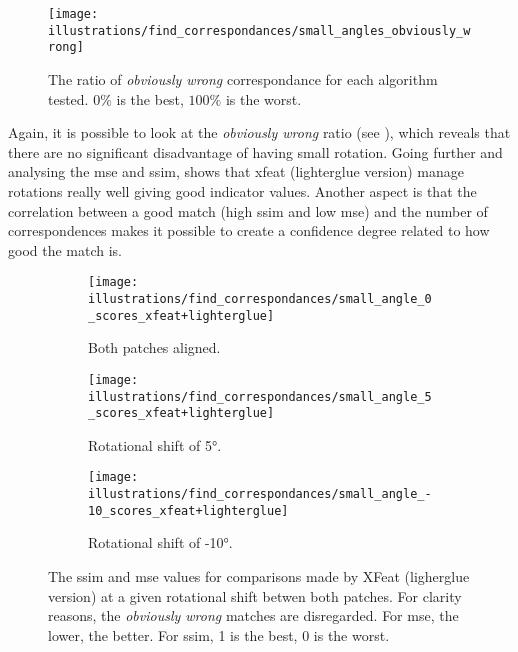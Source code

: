 \begin{figure}[ht!]
    \centering
    \texttt{[image: illustrations/find\_correspondances/small\_angles\_obviously\_wrong]}
    \caption{The ratio of \textit{obviously wrong} correspondance for each algorithm tested.
        $0\%$ is the best, $100\%$ is the worst.}
    \label{fig:find_corr:small_angles:obviously_wrong}
\end{figure}

Again, it is possible to look at the \textit{obviously wrong} ratio (see ),
which reveals that there are no significant disadvantage of having small rotation.
Going further and analysing the \gls{mse} and \gls{ssim},  shows that xfeat (lighterglue version)
manage rotations really well giving good indicator values.
Another aspect is that the correlation between a good match (high \gls{ssim} and low \gls{mse}) and the number of correspondences
makes it possible to create a confidence degree related to how good the match is.

\begin{figure}[ht!]
    \centering
    \begin{subfigure}[t]{0.32\textwidth}
        \texttt{[image: illustrations/find\_correspondances/small\_angle\_0\_scores\_xfeat+lighterglue]}
        \caption{Both patches aligned.}
        \label{fig:find_corr:small_angles:mse_ssim_xfeat+lg_0}
    \end{subfigure}
    \hfill
    \begin{subfigure}[t]{0.32\textwidth}
        \texttt{[image: illustrations/find\_correspondances/small\_angle\_5\_scores\_xfeat+lighterglue]}
        \caption{Rotational shift of 5°.}
        \label{fig:find_corr:small_angles:mse_ssim_xfeat+lg_5}
    \end{subfigure}
    \hfill
    \begin{subfigure}[t]{0.32\textwidth}
        \texttt{[image: illustrations/find\_correspondances/small\_angle\_-10\_scores\_xfeat+lighterglue]}
        \caption{Rotational shift of -10°.}
        \label{fig:find_corr:small_angles:mse_ssim_xfeat+lg_-10}
    \end{subfigure}
    \caption{The \gls{ssim} and \gls{mse} values for comparisons made by XFeat (ligherglue version) at a given rotational shift betwen both patches.
    For clarity reasons, the \textit{obviously wrong} matches are disregarded.
    For \gls{mse}, the lower, the better. For \gls{ssim}, 1 is the best, 0 is the worst.}
    \label{fig:find_corr:small_angles:mse_ssim}
\end{figure}

